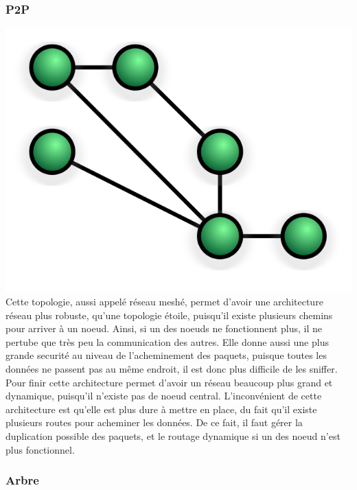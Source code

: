 	    \subsubsection{P2P}
\includegraphics{img/NetworkTopology-Mesh.svg.png}
Cette topologie, aussi appelé réseau meshé, permet d'avoir une architecture réseau plus robuste, qu'une 
topologie étoile, puisqu'il existe plusieurs chemins pour arriver à un noeud. Ainsi, si un des noeuds ne 
fonctionnent plus, il ne pertube que très peu la communication des autres. Elle donne aussi une plus grande 
securité au niveau de l'acheminement des paquets, puisque toutes les données ne passent pas au même endroit, 
il est donc plus difficile de les sniffer. Pour finir cette architecture permet d'avoir un réseau beaucoup 
plus grand et dynamique, puisqu'il n'existe pas de noeud central. L'inconvénient de cette architecture est 
qu'elle est plus dure à mettre en place, du fait qu'il existe plusieurs routes pour acheminer les données. De 
ce fait, il faut gérer la duplication possible des paquets, et le routage dynamique si un des noeud n'est plus 
fonctionnel.

\subsubsection{Arbre}

